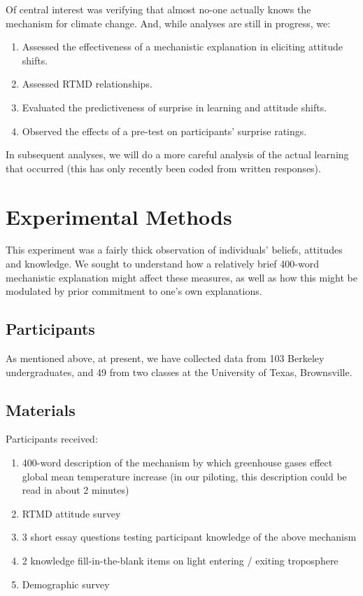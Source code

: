 Of central interest was verifying that almost no-one actually knows the
mechanism for climate change. And, while analyses are still in progress, we:

\begin{enumerate}
\item Assessed the effectiveness of a mechanistic explanation in eliciting
attitude shifts.
\item Assessed RTMD relationships.
\item Evaluated the predictiveness of surprise in learning and attitude shifts.
\item Observed the effects of a pre-test on participants' surprise ratings.
\end{enumerate}

In subsequent analyses, we will do a more careful analysis of the actual
learning that occurred (this has only recently been coded from written responses).


\section{Experimental Methods}

This experiment was a fairly thick observation of individuals' beliefs,
attitudes and knowledge. We sought to understand how a relatively brief 400-word
mechanistic explanation might affect these measures, as well as how this might
be modulated by prior commitment to one's own explanations.

\subsection{Participants}

As mentioned above, at present, we have collected data from 103 Berkeley
undergraduates, and 49 from two classes at the University of Texas,
Brownsville.

\subsection{Materials}

Participants received:

\begin{enumerate}
\item 400-word description of the mechanism 
by which greenhouse gases effect global mean temperature increase (in our
piloting, this description could be read in about 2 minutes)
\item RTMD attitude survey
\item 3 short essay questions testing participant knowledge of the above mechanism
\item 2 knowledge fill-in-the-blank items on light entering / exiting troposphere
\item Demographic survey
\end{enumerate}

